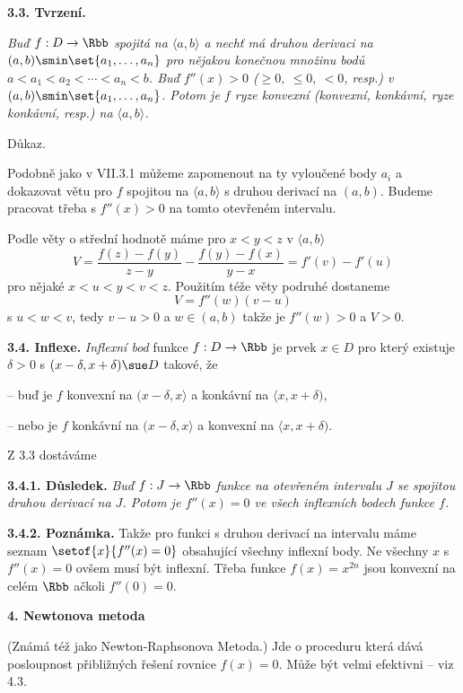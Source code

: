 \documentclass[12pt]{article}
\begin{document}
{{ \bigskip
 
 {\bf 3.3. Tvrzení.}  {\em Buď $f:D\to \Rbb$ spojitá na $\langle a,b\rangle$ a nechť má druhou derivaci na $(a,b)\smin\set{a_1,\dots,a_n}$ pro nějakou konečnou množinu bodů $a<a_1<a_2<\cdots<a_n<b$. Buď $f''(x)>0$ ($\geq 0,\  \leq 0,\ <0$, resp.) v
 $(a,b)\smin\set{a_1,\dots,a_n}$. Potom je $f$ ryze konvexní (konvexní, konkávní, ryze konkávní, resp.) na $\langle a,b\rangle$.
 
 Důkaz.} Podobně jako v VII.3.1 můžeme zapomenout na ty vyloučené body
 $a_i$ a dokazovat větu pro $f$ spojitou na $\langle a,b\rangle$ s druhou derivací na $(a,b)$. Budeme pracovat třeba s $f''(x)>0$ na tomto otevřeném intervalu.
 
Podle věty o střední hodnotě máme pro $x<y<z$ v $\langle a,b\rangle$
 $$
 V=\frac{f(z)-f(y)}{z-y}-\frac{f(y)-f(x)}{y-x}=f'(v)-f'(u)
 $$
 pro nějaké $x<u<y<v<z$. Použitím téže věty podruhé dostaneme
 $$
 V=f''(w)(v-u)
 $$
 s $u<w<v$, tedy $v-u>0$ a $w\in(a,b)$ takže je $f''(w) >0$
 a $V>0$. \sq
 
 
  \bigskip
 
 {\bf 3.4. Inflexe.}  {\em Inflexní bod} funkce $f:D\to\Rbb$ je
prvek $x\in D$ pro který existuje $\delta>0$ s $(x-\delta,x+\delta)\sue D$  takové, že
 
 -- buď je $f$ konvexní na $(x-\delta,x\rangle$ a konkávní na $\langle x,x+\delta)$,
 
  -- nebo je $f$ konkávní na $(x-\delta,x\rangle$ a konvexní na $\langle x,x+\delta)$.
  
  \medskip
  
 Z 3.3 dostáváme
  
  \smallskip
  
  {\bf 3.4.1. 
 Důsledek.} {\em Buď   $f:J\to \Rbb$ funkce na otevřeném intervalu $J$ se spojitou druhou derivací na $J$. Potom je $f''(x)=0$ ve všech inflexních bodech funkce $f$.}
  
  \medskip
  
  {\bf 3.4.2. Poznámka.} Takže pro funkci s druhou derivací na intervalu máme seznam $\setof{x}{f''(x)=0}$ obsahující všechny inflexní body. Ne všechny $x$ s $f''(x)=0$ ovšem musí být inflexní. Třeba funkce $f(x)=x^{2n}$ jsou konvexní na celém  $\Rbb$ ačkoli $f''(0)=0$.
  
  \vskip10mm
 
 {\large\bf 4. Newtonova metoda}
 
 \bigskip
   
 (Známá též jako Newton-Raphsonova Metoda.) Jde o proceduru která dává posloupnost přibližných řešení rovnice $f(x)=0$. Může být velmi efektivni
 -- viz 4.3.
 
}}
\end{document}
